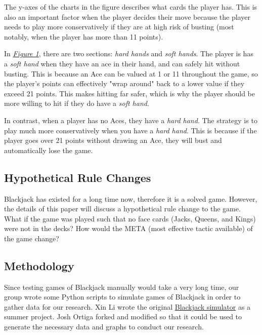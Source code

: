 \documentclass{article}
\begin{document}
{		The y-axes of the charts in the figure describes what cards the player has. This is also an important factor
		when the player decides their move because the player needs to play more conservatively if they are at high
		risk of busting (most notably, when the player has more than 11 points).
		
		In \hyperlink{fig1}{\textit{Figure 1}}, there are two sections: \textit{hard hands} and \textit{soft hands}. The player is
		has a \textit{soft hand} when they have an ace in their hand, and can safely hit without busting. This is
		because an Ace can be valued at 1 or 11 throughout the game, so the player's points can effectively "wrap around"
		back to a lower value if they exceed 21 points. This makes hitting far safer, which is why the player should
		be more willing to hit if they do have a \textit{soft hand}.

		In contrast, when a player has no Aces, they have a \textit{hard hand}. The strategy is to play much 
		more conservatively when you have a \textit{hard hand}. This is because if the player goes over 21 points
		without drawing an Ace, they will bust and automatically lose the game.



	\subsection{Hypothetical Rule Changes}
	\label{sec: Hypothetical Rule Changes}

		Blackjack has existed for a long time now, therefore it is a solved game. However, the details of this paper will discuss a hypothetical rule
		change to the game. What if the game was played such that no face cards (Jacks, Queens, and Kings) were not in the decks? How would
		the META (most effective tactic available) of the game change?

	\subsection{Methodology}
	\label{sec: Methodology}
		
		Since testing games of Blackjack manually would take a very long time, our group wrote some Python scripts to simulate
		games of Blackjack in order to gather data for our research. Xin Li wrote the original \href{https://github.com/JDzzz7/Blackjack}{Blackjack simulator} as a summer project.
		Josh Ortiga forked and modified so that it could be used to generate the necessary data and graphs to conduct our research.

}
\end{document}
